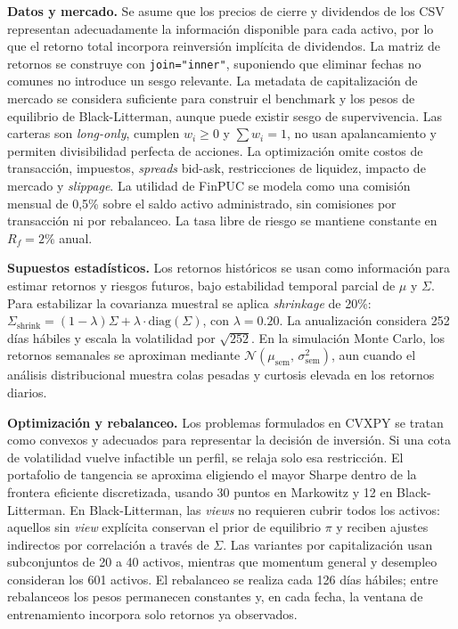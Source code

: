 \textbf{Datos y mercado.} Se asume que los precios de cierre y dividendos de los CSV representan adecuadamente la informaci\'on disponible para cada activo, por lo que el retorno total incorpora reinversi\'on impl\'icita de dividendos. La matriz de retornos se construye con \texttt{join="inner"}, suponiendo que eliminar fechas no comunes no introduce un sesgo relevante. La metadata de capitalizaci\'on de mercado se considera suficiente para construir el benchmark y los pesos de equilibrio de Black-Litterman, aunque puede existir sesgo de supervivencia. Las carteras son \textit{long-only}, cumplen $w_i \geq 0$ y $\sum w_i = 1$, no usan apalancamiento y permiten divisibilidad perfecta de acciones. La optimizaci\'on omite costos de transacci\'on, impuestos, \textit{spreads} bid-ask, restricciones de liquidez, impacto de mercado y \textit{slippage}. La utilidad de FinPUC se modela como una comisi\'on mensual de 0,5\% sobre el saldo activo administrado, sin comisiones por transacci\'on ni por rebalanceo. La tasa libre de riesgo se mantiene constante en $R_f = 2\%$ anual.

\textbf{Supuestos estad\'isticos.} Los retornos hist\'oricos se usan como informaci\'on para estimar retornos y riesgos futuros, bajo estabilidad temporal parcial de $\mu$ y $\Sigma$. Para estabilizar la covarianza muestral se aplica \textit{shrinkage} de 20\%: $\Sigma_{\text{shrink}} = (1-\lambda)\Sigma + \lambda \cdot \text{diag}(\Sigma)$, con $\lambda = 0.20$. La anualizaci\'on considera 252 d\'ias h\'abiles y escala la volatilidad por $\sqrt{252}$. En la simulaci\'on Monte Carlo, los retornos semanales se aproximan mediante $\mathcal{N}(\mu_{\text{sem}},\, \sigma_{\text{sem}}^2)$, aun cuando el an\'alisis distribucional muestra colas pesadas y curtosis elevada en los retornos diarios.

\textbf{Optimizaci\'on y rebalanceo.} Los problemas formulados en CVXPY se tratan como convexos y adecuados para representar la decisi\'on de inversi\'on. Si una cota de volatilidad vuelve infactible un perfil, se relaja solo esa restricci\'on. El portafolio de tangencia se aproxima eligiendo el mayor Sharpe dentro de la frontera eficiente discretizada, usando 30 puntos en Markowitz y 12 en Black-Litterman. En Black-Litterman, las \textit{views} no requieren cubrir todos los activos: aquellos sin \textit{view} expl\'icita conservan el prior de equilibrio $\pi$ y reciben ajustes indirectos por correlaci\'on a trav\'es de $\Sigma$. Las variantes por capitalizaci\'on usan subconjuntos de 20 a 40 activos, mientras que momentum general y desempleo consideran los 601 activos. El rebalanceo se realiza cada 126 d\'ias h\'abiles; entre rebalanceos los pesos permanecen constantes y, en cada fecha, la ventana de entrenamiento incorpora solo retornos ya observados.

